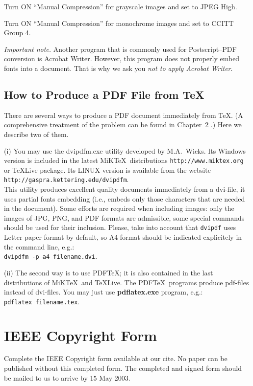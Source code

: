 \documentclass{physcon}
\begin{document}
Turn ON ``Manual Compression'' for grayscale images and set to JPEG High.
 
Turn ON ``Manual Compression'' for monochrome images and set to 
CCITT Group 4. 


{\em Important note.} Another program that is commonly used for
Postscript--PDF conversion is Acrobat Writer. However, this
program does not properly embed fonts into a document. 
That is why we ask you {\em not to apply Acrobat Writer}.

\subsection{How to Produce a PDF File from \TeX}

There are several ways to produce a PDF document 
immediately from \TeX.
(A comprehensive treatment of the problem can be found in
Chapter~2 \cite{1}.) Here we describe two of them.

(i) You may use the dvipdfm.exe utility developed by
M.A.~Wicks. Its Windows version is included in the latest
MiK\TeX\ distributions 
{\tt http://www.miktex.org} or \TeX Live package. 
Its LINUX version is
available from the website\\ 
{\tt  http://gaspra.kettering.edu/dvipdfm}.\\
This utility produces excellent quality documents immediately
from a dvi-file, it uses partial fonts embedding (i.e., embeds
only those characters that are needed in the document).  
Some efforts are required when including images: only the images
of JPG, PNG, and PDF formats are admissible, some special commands
should be used for their inclusion.
Please, take into account that {\tt dvipdf} uses Letter paper format
by default, so A4 format should be indicated explicitely in
the command line, e.g.:\\
{\tt dvipdfm -p a4 filename.dvi}.

(ii) The second way is to use PDF\TeX; it is also contained in 
the last distributions of MiK\TeX\ and \TeX Live.
The PDF\TeX\ programs produce pdf-files instead of dvi-files.
You may just use {\bf pdflatex.exe} program, e.g.:\\
{\tt   pdflatex filename.tex}.

\section{IEEE Copyright Form}

Complete the IEEE Copyright form available at our cite. 
No paper can be published without this completed form. 
The completed and signed form should be mailed 
to us to arrive by 15 May 2003. 
\end{document}
